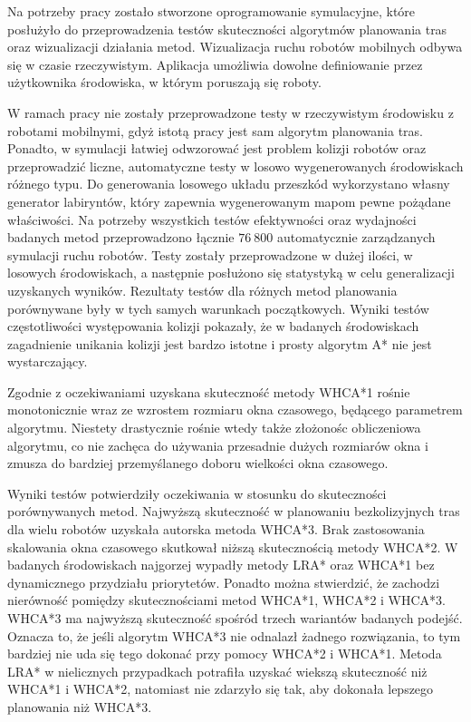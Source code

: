 Na potrzeby pracy zostało stworzone oprogramowanie symulacyjne, które posłużyło do przeprowadzenia testów skuteczności algorytmów planowania tras oraz wizualizacji działania metod.
Wizualizacja ruchu robotów mobilnych odbywa się w czasie rzeczywistym.
Aplikacja umożliwia dowolne definiowanie przez użytkownika środowiska, w którym poruszają się roboty.

W ramach pracy nie zostały przeprowadzone testy w rzeczywistym środowisku z robotami mobilnymi, gdyż istotą pracy jest sam algorytm planowania tras.
Ponadto, w symulacji łatwiej odwzorować jest problem kolizji robotów oraz przeprowadzić liczne, automatyczne testy w losowo wygenerowanych środowiskach różnego typu.
Do generowania losowego układu przeszkód wykorzystano własny generator labiryntów, który zapewnia wygenerowanym mapom pewne pożądane właściwości.
Na potrzeby wszystkich testów efektywności oraz wydajności badanych metod przeprowadzono łącznie $76\ 800$ automatycznie zarządzanych symulacji ruchu robotów.
Testy zostały przeprowadzone w dużej ilości, w losowych środowiskach, a następnie posłużono się statystyką w celu generalizacji uzyskanych wyników.
Rezultaty testów dla różnych metod planowania porównywane były w tych samych warunkach początkowych.
Wyniki testów częstotliwości występowania kolizji pokazały, że w badanych środowiskach zagadnienie unikania kolizji jest bardzo istotne i prosty algorytm A* nie jest wystarczający.

Zgodnie z oczekiwaniami uzyskana skuteczność metody WHCA*1 rośnie monotonicznie wraz ze wzrostem rozmiaru okna czasowego, będącego parametrem algorytmu.
Niestety drastycznie rośnie wtedy także złożonośc obliczeniowa algorytmu, co nie zachęca do używania przesadnie dużych rozmiarów okna i zmusza do bardziej przemyślanego doboru wielkości okna czasowego.

Wyniki testów potwierdziły oczekiwania w stosunku do skuteczności porównywanych metod.
Najwyższą skuteczność w planowaniu bezkolizyjnych tras dla wielu robotów uzyskała autorska metoda WHCA*3.
Brak zastosowania skalowania okna czasowego skutkował niższą skutecznością metody WHCA*2.
W badanych środowiskach najgorzej wypadły metody LRA* oraz WHCA*1 bez dynamicznego przydziału priorytetów.
Ponadto można stwierdzić, że zachodzi nierówność pomiędzy skutecznościami metod WHCA*1, WHCA*2 i WHCA*3.
WHCA*3 ma najwyższą skuteczność spośród trzech wariantów badanych podejść.
Oznacza to, że jeśli algorytm WHCA*3 nie odnalazł żadnego rozwiązania, to tym bardziej nie uda się tego dokonać przy pomocy WHCA*2 i WHCA*1.
Metoda LRA* w nielicznych przypadkach potrafiła uzyskać wiekszą skuteczność niż WHCA*1 i WHCA*2, natomiast nie zdarzyło się tak, aby dokonała lepszego planowania niż WHCA*3.

